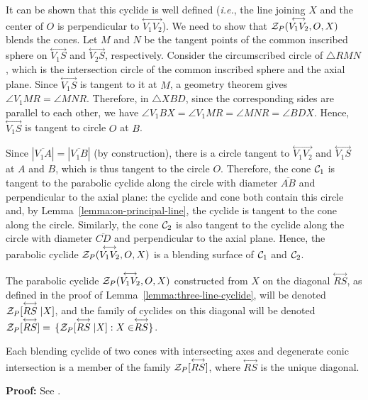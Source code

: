 It can be shown that this cyclide is well defined ({\it i.e.}, the line 
joining $X$ and the center of $O$ is perpendicular to
$\stackrel{\longleftrightarrow}{V_1V_2}$).
We need to show that \mbox{${\cal Z}_P(\stackrel{\longleftrightarrow}{V_1V_2},O,X)$}
blends the cones.
Let $M$ and $N$ be the tangent points of the common inscribed 
sphere on $\stackrel{\longleftrightarrow}{V_1S}$ and
$\stackrel{\longleftrightarrow}{V_2S}$, respectively.
Consider the circumscribed circle of $\bigtriangleup RMN$, which is the
intersection circle of the common inscribed sphere and the axial plane.
Since $\stackrel{\longleftrightarrow}{V_1S}$ is tangent to it at $M$, a
geometry theorem gives $\angle V_1MR=\angle MNR$.  Therefore, in
$\bigtriangleup XBD$, since the corresponding sides are parallel to each other,
we have $\angle V_1BX=\angle V_1MR=\angle MNR=\angle BDX$. 
Hence, $\stackrel{\longleftrightarrow}{V_1S}$ is tangent to circle $O$ at $B$.

Since $|\overline{V_1A}|=|\overline{V_1B}|$ (by construction),
there is a circle tangent to 
$\stackrel{\longleftrightarrow}{V_1V_2}$ and 
$\stackrel{\longleftrightarrow}{V_1S}$ at $A$ and $B$,
which is thus tangent to the circle $O$.
Therefore, the cone ${\cal C}_1$ is tangent
to the parabolic cyclide along the circle with diameter $\overline{AB}$ and
perpendicular to the axial plane: the cyclide and cone both contain this circle
and, by Lemma~\ref{lemma:on-principal-line}, 
the cyclide is tangent to the cone along the circle.
Similarly, the cone ${\cal C}_2$ is
also tangent to the cyclide along the circle with diameter $\overline{CD}$
and perpendicular to the axial plane.  Hence, the parabolic cyclide
${\cal Z}_P(\stackrel{\longleftrightarrow}{V_1V_2},O,X)$
is a blending surface of ${\cal C}_1$ and ${\cal C}_2$.
\QED

\begin{definition}
The parabolic cyclide ${\cal Z}_P(\stackrel{\longleftrightarrow}{V_1V_2},O,X)$
constructed from $X$ on the diagonal $\stackrel{\longleftrightarrow}{RS}$, 
as defined in the proof of Lemma~\ref{lemma:three-line-cyclide},
will be denoted 
\mbox{${\cal Z}_P[\stackrel{\longleftrightarrow}{RS}|X]$},
and the family of cyclides on this diagonal will be denoted\\
${\cal Z}_P[\stackrel{\longleftrightarrow}{RS}] =$
\mbox{$\{ {\cal Z}_P[\stackrel{\longleftrightarrow}{RS}|X]: X \in 
\stackrel{\longleftrightarrow}{RS}\}$}.
\end{definition}

\begin{lemma}
\label{lemma:1-parabolic}
     Each blending cyclide of two cones with intersecting
axes and degenerate conic intersection is a member of the family
${\cal Z}_P[\stackrel{\longleftrightarrow}{RS}]$,
where $\stackrel{\longleftrightarrow}{RS}$ is the unique diagonal.
\end{lemma}
{\bf Proof:} 
See \cite[Lemma~5.19]{shenethesis}.
\QED

